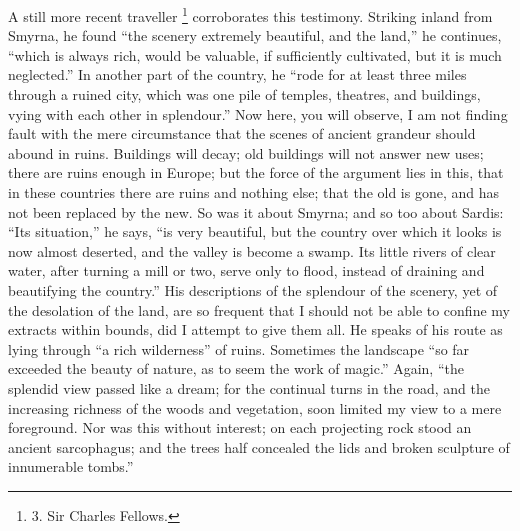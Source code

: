 A still more recent traveller
\footnote{3.
Sir Charles Fellows.} corroborates this
testimony. Striking inland from Smyrna, he found ``the scenery
extremely beautiful, and the land,'' he continues, ``which is always
rich, would be valuable, if sufficiently cultivated, but it is much
neglected.'' In another part of the country, he ``rode for at least
three miles through a ruined city, which was one pile of temples,
theatres, and buildings, vying with each other in splendour.'' Now
here, you will observe, I am not finding fault with the mere
circumstance that the scenes of ancient grandeur should abound in
ruins. Buildings will decay; old buildings will not answer new uses;
there are ruins enough in Europe; but the force of the argument lies
in this, that in these countries there are ruins and nothing else;
that the old is gone, and has not been replaced by the new. So was it
about Smyrna; and so too about Sardis: ``Its situation,'' he says, ``is
very beautiful, but the country over which it looks is now almost
deserted, and the valley is become a swamp. Its little rivers of clear
water, after turning a mill or two, serve only to flood, instead of
draining and beautifying the country.'' His descriptions of the
splendour of the scenery, yet of the desolation of the land, are so
frequent that I should not be able to confine my extracts within
bounds, did I attempt to give them all. He speaks of his route as
lying through ``a rich wilderness'' of ruins. Sometimes the landscape ``so
far exceeded the beauty of nature, as to seem the work of magic.''
Again, ``the splendid view passed like a dream; for the continual turns
in the road, and the increasing richness of the woods and vegetation,
soon limited my view to a mere foreground. Nor was this without
interest; on each projecting rock stood an ancient sarcophagus; and
the trees half concealed the lids and broken sculpture of innumerable
tombs.''

